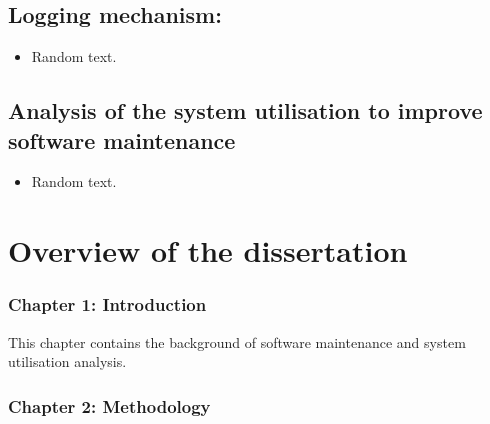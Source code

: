 \subsection{Logging mechanism:}
\begin{itemize}
	\item Random text.
\end{itemize}

\subsection{Analysis of the system utilisation to improve software maintenance}
\begin{itemize}
	\item Random text.
\end{itemize}

\section{Overview of the dissertation}
\subsubsection{Chapter 1: Introduction}
This chapter contains the background of software maintenance and system
utilisation analysis.
\subsubsection{Chapter 2: Methodology}
